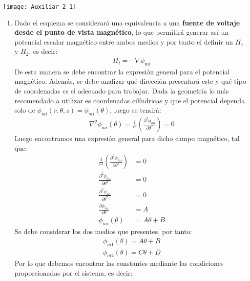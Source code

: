 \documentclass[
  11pt,
  letterpaper,
   addpoints,
   answers
  ]{exam}
\begin{document}
\begin{questions}
    \begin{center}
        \texttt{[image: Auxiliar\_2\_1]}
    \end{center}
    \begin{solution}
        \begin{enumerate}
            \item Dado el esquema se considerará una equivalencia a una \textbf{fuente de voltaje desde el punto de vista magnético}, lo que permitirá generar así un potencial escalar magnético entre ambos medios y por tanto el definir un $H_{1}$ y $H_{2}$, es decir:
            \begin{align}
                H_{i}= -\nabla \phi_{mi}
            \end{align}
            De esta manera se debe encontrar la expresión general para el potencial magnético. Además, se debe analizar qué dirección presentará este y qué tipo de coordenadas es el adecuado para trabajar. Dada la geometría lo más recomendado a utilizar es coordenadas cilíndricas y que el potencial dependa solo de $\phi_{mi}(r,\theta,z) = \phi_{mi}(\theta)$, luego se tendrá:
            \begin{align}
                \nabla^{2}\phi_{mi}(\theta) = \frac{1}{r^{2}}\left(\frac{\partial^{2}\phi_{mi}}{\partial\theta^{2}}\right)= 0
            \end{align}
            Luego encontramos una expresión general para dicho campo magnético, tal que:
            \begin{align}
                \frac{1}{r^{2}} \left(\frac{\partial^{2}\phi_{mi}}{\partial\theta^{2}}\right) &= 0\\
                \frac{\partial^{2}\phi_{mi}}{\partial\theta^{2}} &=0\\
                \frac{\partial^{2}\phi_{mi}}{\partial\theta^{2}} &=0\\
                \frac{\partial \phi_{mi}}{\partial \theta} &= A\\
                \phi_{mi}(\theta) &= A\theta + B 
            \end{align}
            Se debe considerar los dos medios que presentes, por tanto:
            \begin{align}
                \phi_{m1}(\theta) = A\theta + B\\
                \phi_{m2}(\theta) = C\theta + D
            \end{align}
            Por lo que debemos encontrar las constantes mediante las condiciones proporcionadas por el sistema, es decir:\\

\end{enumerate}
\end{solution}
\end{questions}
\end{document}
